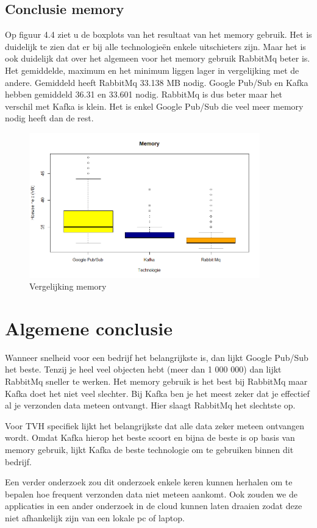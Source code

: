 \subsection{Conclusie memory}

Op figuur 4.4 ziet u de boxplots van het resultaat van het memory gebruik. Het is duidelijk te zien dat er bij alle technologieën enkele uitschieters zijn. Maar het is ook duidelijk dat over het algemeen voor het memory gebruik RabbitMq beter is. Het gemiddelde, maximum en het minimum liggen lager in vergelijking met de andere. Gemiddeld heeft RabbitMq 33.138 MB nodig. Google Pub/Sub en Kafka hebben gemiddeld 36.31 en 33.601 nodig. RabbitMq is dus beter maar het verschil met Kafka is klein. Het is enkel Google Pub/Sub die veel meer memory nodig heeft dan de rest.
\begin{figure}[h!]
    \centering
    \includegraphics[width=100mm]{../memory.png}
    \caption{Vergelijking memory}
    
\end{figure}



\section{Algemene conclusie}
Wanneer snelheid voor een bedrijf het belangrijkste is, dan lijkt Google Pub/Sub het beste. Tenzij je heel veel objecten hebt (meer dan 1 000 000) dan lijkt RabbitMq sneller te werken. Het memory gebruik is het best bij RabbitMq maar Kafka doet het niet veel slechter. Bij Kafka ben je het meest zeker dat je effectief al je verzonden data meteen ontvangt. Hier slaagt RabbitMq het slechtste op.

Voor TVH specifiek lijkt het belangrijkste dat alle data zeker meteen ontvangen wordt. Omdat Kafka hierop het beste scoort en bijna de beste is op basis van memory gebruik, lijkt Kafka de beste technologie om te gebruiken binnen dit bedrijf.

Een verder onderzoek zou dit onderzoek enkele keren kunnen herhalen om te bepalen hoe frequent verzonden data niet meteen aankomt. Ook zouden we de applicaties in een ander onderzoek in de cloud kunnen laten draaien zodat deze niet afhankelijk zijn van een lokale pc of laptop.


